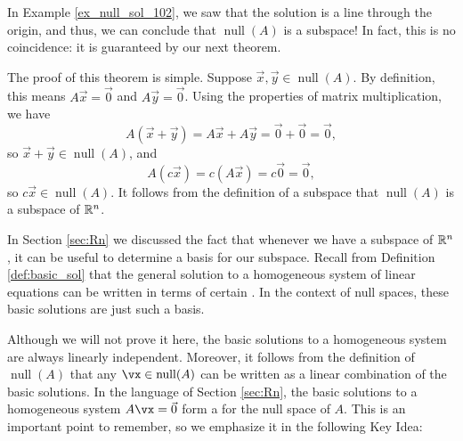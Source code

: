 In Example \ref{ex_null_sol_102}, we saw that the solution is a line through the origin, and thus, we can conclude that $\operatorname{null}(A)$ is a subspace! In fact, this is no coincidence: it is guaranteed by our next theorem.

\smallskip


\smallskip

The proof of this theorem is simple. Suppose $\vec x, \vec y\in \operatorname{null}(A)$. By definition, this means $A\vec x = \vec 0$ and $A\vec y = \vec 0$. Using the properties of matrix multiplication, we have
\[
A(\vec x + \vec y) = A\vec x + A\vec y = \vec 0 + \vec 0 = \vec 0,
\]
so $\vec x + \vec y\in \operatorname{null}(A)$, and
\[
A(c\vec x) = c(A\vec x) = c\vec 0 = \vec 0,
\]
so $c\vec x\in \operatorname{null}(A)$. It follows from the definition of a subspace that $\operatorname{null}(A)$ is a subspace of $\mathbb{R}^n$.

In Section \ref{sec:Rn} we discussed the fact that whenever we have a subspace of $\mathbb{R}^n$, it can be useful to determine a basis for our subspace. Recall from Definition \ref{def:basic_sol} that the general solution to a homogeneous system of linear equations can be written in terms of certain . In the context of null spaces, these basic solutions are  just such a basis.

Although we will not prove it here, the basic solutions to a homogeneous system are always linearly independent. Moreover, it follows from the definition of $\operatorname{null}(A)$ that any $\vx \in\operatorname{null}(A)$ can be written as a linear combination of the basic solutions. In the language of Section \ref{sec:Rn}, the basic solutions to a homogeneous system $A\vx = \vec 0$ form a   for the null space of $A$. This is an important point to remember, so we emphasize it in the following Key Idea:

\smallskip


